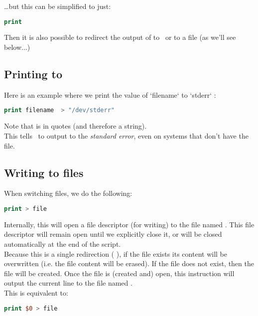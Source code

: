\dots but this can be simplified to just:

\begin{lstlisting}[language=awk]
print
\end{lstlisting}

Then it is also possible to redirect the output of  to \stderr\ or to a file (as we'll see below...)





\subsection*{Printing to \stderr}

Here is an example where we print the value of `filename` to `stderr` :
\begin{lstlisting}[language=awk]
print filename  > "/dev/stderr"
\end{lstlisting}

Note that  is in quotes (and therefore a string). \\

This tells \gawk\ to output to the \emph{standard error}, even on systems that don't have the  file.



\subsection*{Writing to files}

When switching files, we do the following:
\begin{lstlisting}[language=awk]
print > file
\end{lstlisting}

Internally, this will open a file descriptor (for writing) to the file named . This file descriptor will remain open until we explicitly close it, or will be closed automatically at the end of the script. \\

Because this is a single redirection ( \cmd{>} ), if the file exists its content will be overwritten (i.e. the file content will be erased). If the file does not exist, then the file will be created. Once the file is (created and) open, this instruction will output the current line to the file named . \\

This is equivalent to:
\begin{lstlisting}[language=awk]
print $0 > file
\end{lstlisting}

